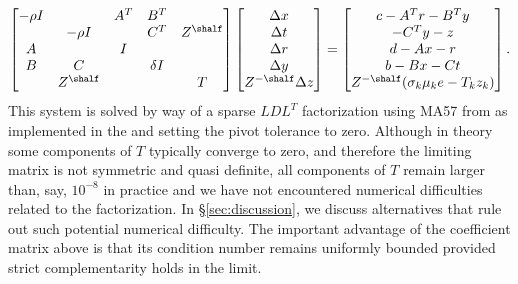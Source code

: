 \documentclass{amsart}
\begin{document}
\begin{equation}
  \label{eq:newton-sys-slack}
  \begin{bmatrix}
    -\rho I &              & A^T & B^T      & \\
            & -\rho I      &     & C^T      & Z^{\shalf} \\
     A      &              & I   &          & \\
     B      &  C           &     & \delta I & \\
            &  Z^{\shalf} &     &          & T
  \end{bmatrix}
  \begin{bmatrix}
    \Delta x \\ \Delta t \\ \Delta r \\ \Delta y \\ Z^{-\shalf} \Delta z
  \end{bmatrix}
  =
  \begin{bmatrix}
    c - A^T r - B^T y \\
    -C^T y - z \\
    d - Ax - r \\
    b - Bx - Ct \\
    Z^{-\shalf} (\sigma_k \mu_k e - T_k z_k)
  \end{bmatrix}.
\end{equation}
This system is solved by way of a sparse $LDL^T$ factorization using
\textsf{MA57} from \cite{duff-2004} as implemented in the \cite{HSL} and
setting the pivot tolerance to zero. Although in theory some components of $T$
typically converge to zero, and therefore the limiting matrix is not symmetric
and quasi definite, all components of $T$ remain larger than, say, $10^{-8}$ in
practice and we have not encountered numerical difficulties related to the
factorization. In \S\ref{sec:discussion}, we discuss alternatives that rule out
such potential numerical difficulty. The important advantage of the
coefficient matrix above is that its condition number remains uniformly bounded
provided strict complementarity holds in the limit.
\end{document}
